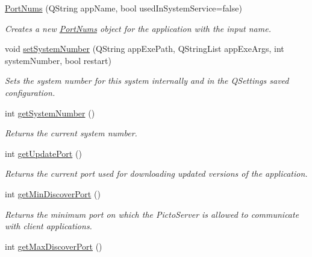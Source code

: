 \begin{DoxyCompactItemize}
\item 
\hyperlink{class_picto_1_1_port_nums_a609db28950169e6a649258de9bb42ad3}{Port\-Nums} (Q\-String app\-Name, bool used\-In\-System\-Service=false)
\begin{DoxyCompactList}\small\item\em Creates a new \hyperlink{class_picto_1_1_port_nums}{Port\-Nums} object for the application with the input name. \end{DoxyCompactList}\item 
void \hyperlink{class_picto_1_1_port_nums_a31ecb0650e5eb7cf1c1d650180ddcf9b}{set\-System\-Number} (Q\-String app\-Exe\-Path, Q\-String\-List app\-Exe\-Args, int system\-Number, bool restart)
\begin{DoxyCompactList}\small\item\em Sets the system number for this system internally and in the Q\-Settings saved configuration. \end{DoxyCompactList}\item 
\hypertarget{class_picto_1_1_port_nums_aa3208b7490eb372b8415004ddafbb473}{int \hyperlink{class_picto_1_1_port_nums_aa3208b7490eb372b8415004ddafbb473}{get\-System\-Number} ()}\label{class_picto_1_1_port_nums_aa3208b7490eb372b8415004ddafbb473}

\begin{DoxyCompactList}\small\item\em Returns the current system number. \end{DoxyCompactList}\item 
\hypertarget{class_picto_1_1_port_nums_a4dafc3718dfeab7ce01cb52ba37aff98}{int \hyperlink{class_picto_1_1_port_nums_a4dafc3718dfeab7ce01cb52ba37aff98}{get\-Update\-Port} ()}\label{class_picto_1_1_port_nums_a4dafc3718dfeab7ce01cb52ba37aff98}

\begin{DoxyCompactList}\small\item\em Returns the current port used for downloading updated versions of the application. \end{DoxyCompactList}\item 
\hypertarget{class_picto_1_1_port_nums_a308fba1450845a76d9ca93cf0b384fbf}{int \hyperlink{class_picto_1_1_port_nums_a308fba1450845a76d9ca93cf0b384fbf}{get\-Min\-Discover\-Port} ()}\label{class_picto_1_1_port_nums_a308fba1450845a76d9ca93cf0b384fbf}

\begin{DoxyCompactList}\small\item\em Returns the minimum port on which the Picto\-Server is allowed to communicate with client applications. \end{DoxyCompactList}\item 
\hypertarget{class_picto_1_1_port_nums_a41533afb873594150b50cc982c1b0d28}{int \hyperlink{class_picto_1_1_port_nums_a41533afb873594150b50cc982c1b0d28}{get\-Max\-Discover\-Port} ()}\label{class_picto_1_1_port_nums_a41533afb873594150b50cc982c1b0d28}


\end{DoxyCompactItemize}
